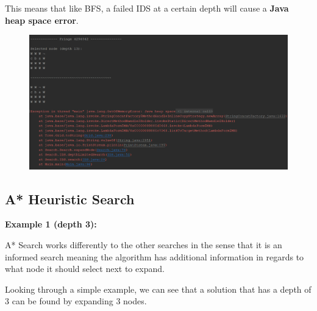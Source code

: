 \documentclass{article}
\begin{document}
	\newpage
	This means that like BFS, a failed IDS at a certain depth will cause a \textbf{Java heap space error}.
	
	\begin{figure}[h]
		\centering
		\includegraphics[height=0.43\textheight]{IDS-2-2.png}
	\end{figure}
	
	\newpage
	\subsection{A* Heuristic Search}
	\textbf{Example 1 (depth 3):}
	
	A* Search works differently to the other searches in the sense that it is an informed search meaning the algorithm has additional information in regards to what node it should select next to expand.
	
	Looking through a simple example, we can see that a solution that has a depth of 3 can be found by expanding 3 nodes.
	
\end{document}
